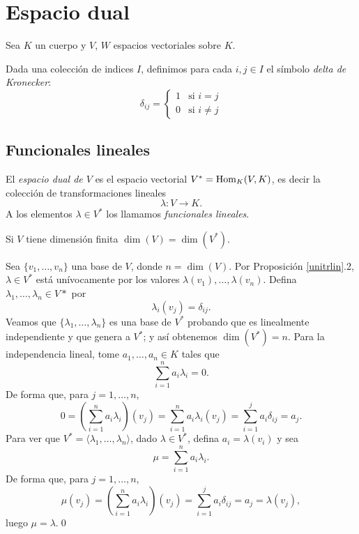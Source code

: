 \chapter{Espacio dual}

Sea $K$ un cuerpo y $V$, $W$ espacios vectoriales sobre $K$.

\begin{nota}
Dada una colecci\'on de indices $I$, definimos para cada $i,j\in I$ el s\'imbolo \emph{delta de Kronecker}:
\[
\delta_{ij}=\left\{\begin{array}{rl}1 & \textrm{si } i=j\\ 0 & \textrm{si } i\ne j\end{array}\right.
\]
\end{nota}

\section{Funcionales lineales}

\begin{defn}
El \emph{espacio dual de $V$} es el espacio vectorial $V^*=\operatorname{Hom}_K(V,K)$, es decir la colecci\'on de transformaciones lineales
\[
\lambda: V\longrightarrow K.
\]
A los elementos $\lambda\in V^*$ los llamamos \emph{funcionales lineales}. 
\end{defn}

\begin{prop}
Si $V$ tiene dimensi\'on finita $\dim(V)=\dim(V^*)$.
\end{prop}

\dem Sea $\{v_1,\ldots,v_n\}$ una base de $V$, donde $n=\dim(V)$. Por Proposici\'on \ref{unitrlin}.2, $\lambda\in V^*$ est\'a un\'ivocamente por los valores $\lambda(v_1),\ldots,\lambda(v_n)$. Defina $\lambda_1,\ldots,\lambda_n\in V*$ por
\[
\lambda_i(v_j)=\delta_{ij}.
\]
Veamos que $\{\lambda_1,\ldots,\lambda_n\}$ es una base de $V^*$ probando que es linealmente independiente y que genera a $V^*$; y as\'i obtenemos $\dim(V^*)=n$. Para la independencia lineal, tome $a_1,\ldots,a_n\in K$ tales que
\[
\sum_{i=1}^na_i\lambda_i=0.
\]
De forma que, para $j=1,\ldots,n$,
\[
0=\left(\sum_{i=1}^na_i\lambda_i\right)(v_j)=\sum_{i=1}^na_i\lambda_i(v_j)=\sum_{i=1}^ja_i\delta_{ij}=a_j.
\]
Para ver que $V^*=\langle\lambda_1,\ldots,\lambda_n\rangle$, dado $\lambda\in V^*$, defina $a_i=\lambda(v_i)$ y sea 
\[
\mu=\sum_{i=1}^na_i\lambda_i.
\]
De forma que, para $j=1,\ldots,n$,
\[
\mu(v_j)=\left(\sum_{i=1}^na_i\lambda_i\right)(v_j)=\sum_{i=1}^ja_i\delta_{ij}=a_j=\lambda(v_j),
\]
luego $\mu=\lambda$.\qed


